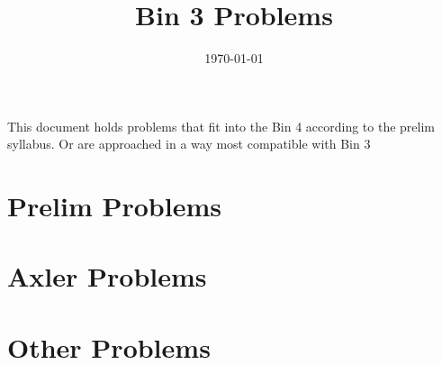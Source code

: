 \documentclass[answers]{exam}
\title{Bin 3 Problems}
\date{\today}
\author{}
\begin{document}
\maketitle
This document holds problems that fit into the Bin 4 according to the prelim syllabus. Or are approached 
in a way most compatible with Bin 3

\tableofcontents

\section{Prelim Problems}
\begin{questions}
\end{questions}

\section{Axler Problems}
\begin{questions}
\end{questions}

\section{Other Problems}
\begin{questions}
\end{questions}
\end{document}
